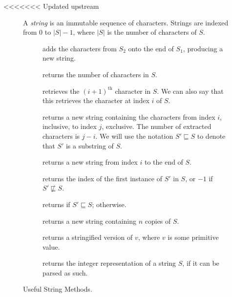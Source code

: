 <<<<<<< Updated upstream

\begin{figure}[tp]
  \small
  \begin{tcolorbox}[title=String Class]
    A \textit{string} is an immutable sequence of characters. Strings are indexed from $0$ to $|S|-1$, where $|S|$ is the number of characters of $S$.
    \vspace{2ex}
  \begin{description}
    \item[] adds the characters from $S_2$ onto the end of $S_1$, producing a new string.
    \item[] returns the number of characters in $S$.
    \item[] retrieves the $(i + 1)^\text{th}$ character in $S$. We can also say that this retrieves the character at index $i$ of $S$.
    \item[] returns a new string containing the characters from index $i$, inclusive, to index $j$, exclusive. The number of extracted characters is $j - i$. We will use the notation $S' \sqsubseteq S$ to denote that $S'$ is a substring of $S$.
    \item[] returns a new string from index $i$ to the end of $S$.
    \item[] returns the index of the first instance of $S'$ in $S$, or $-1$ if $S' \not\sqsubseteq S$.
    \item[] returns  if $S' \sqsubseteq S$;  otherwise.
    \item[] returns a new string containing $n$ copies of $S$.
    \item[] returns a stringified version of $v$, where $v$ is some primitive value.
    \item[] returns the integer representation of a string $S$, if it can be parsed as such.
  \end{description}
\end{tcolorbox}
  \caption{Useful String Methods.}
  \label{fig:strings}
\end{figure}
